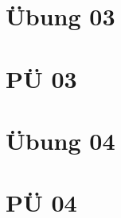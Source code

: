 \documentclass[paper=a4, fontsize=11pt]{scrartcl}
\numberwithin{equation}{section}
\numberwithin{figure}{section}
\numberwithin{table}{section}
\begin{document}

\newpage

\section{Übung 03}


\newpage

\section{PÜ 03}


\newpage

\section{Übung 04}


\newpage

\section{PÜ 04}

\end{document}
